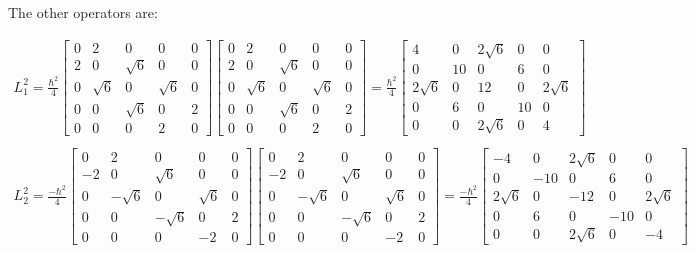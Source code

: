 The other operators are:

\begin{equation}
  \begin{array}{c}
    L_1^2 =\frac{\hbar^2}{4}\left[\begin{matrix}
      0 & 2 & 0 & 0 & 0\\
      2 & 0 & \sqrt{6} & 0 & 0\\
      0 & \sqrt{6} & 0 & \sqrt{6} & 0\\
      0 & 0 & \sqrt{6} & 0 & 2\\
      0 & 0 & 0 & 2 & 0
    \end{matrix}\right]\left[\begin{matrix}
      0 & 2 & 0 & 0 & 0\\
      2 & 0 & \sqrt{6} & 0 & 0\\
      0 & \sqrt{6} & 0 & \sqrt{6} & 0\\
      0 & 0 & \sqrt{6} & 0 & 2\\
      0 & 0 & 0 & 2 & 0
    \end{matrix}\right] =
    \frac{\hbar^2}{4}\left[\begin{matrix}
      4 & 0 & 2\sqrt{6} & 0 & 0\\
      0 & 10 & 0 & 6 & 0\\
      2\sqrt{6} & 0 & 12 & 0 & 2\sqrt{6}\\
      0 & 6 & 0 & 10 & 0\\
      0 & 0 & 2\sqrt{6} & 0 & 4
    \end{matrix}\right]
    \\

    \\
    L_2^2 = \frac{-\hbar^2}{4}\left[\begin{matrix}
      0 & 2 & 0 & 0 & 0\\
      -2 & 0 & \sqrt{6} & 0 & 0\\
      0 & -\sqrt{6} & 0 & \sqrt{6} & 0\\
      0 & 0 & -\sqrt{6} & 0 & 2\\
      0 & 0 & 0 & -2 & 0
    \end{matrix}\right]\left[\begin{matrix}
      0 & 2 & 0 & 0 & 0\\
      -2 & 0 & \sqrt{6} & 0 & 0\\
      0 & -\sqrt{6} & 0 & \sqrt{6} & 0\\
      0 & 0 & -\sqrt{6} & 0 & 2\\
      0 & 0 & 0 & -2 & 0
    \end{matrix}\right] =
    \frac{-\hbar^2}{4}\left[\begin{matrix}
      -4 & 0 & 2\sqrt{6} & 0 & 0\\
      0 & -10 & 0 & 6 & 0\\
      2\sqrt{6} & 0 & -12 & 0 & 2\sqrt{6}\\
      0 & 6 & 0 & -10 & 0\\
      0 & 0 & 2\sqrt{6} & 0 & -4
    \end{matrix}\right]
    \\


\end{array}
\end{equation}
